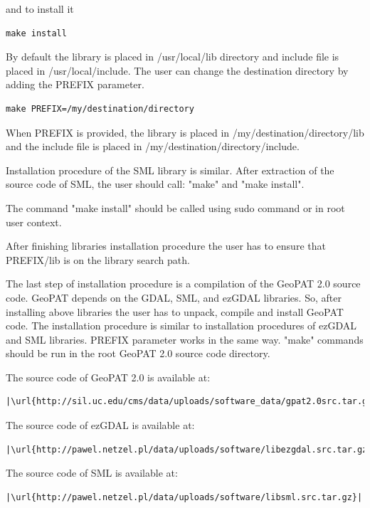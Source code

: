 \documentclass[12pt,margin=0.5in]{article}
\begin{document}
\begin{appendices}
and to install it

\begin{lstlisting}
make install
\end{lstlisting}

By default the library is placed in /usr/local/lib directory and
include file is placed in /usr/local/include.
The user can change the destination directory by adding the PREFIX parameter.

\begin{lstlisting}
make PREFIX=/my/destination/directory
\end{lstlisting}

When PREFIX is provided, the library is placed in
/my/destination/directory/lib and the include file is placed in
/my/destination/directory/include.

Installation procedure of the SML library is similar. After extraction of the source code of SML, the user should call: "make" and "make install".

The command "make install" should be called using sudo command or in
root user context.

After finishing libraries installation procedure the user has to ensure that
PREFIX/lib is on the library search path.

The last step of installation procedure is a compilation of the GeoPAT 2.0
source code. GeoPAT depends on the GDAL, SML, and ezGDAL libraries.
So, after installing above libraries the user has to unpack, compile
and install GeoPAT code.
The installation procedure is similar to installation procedures of
ezGDAL and SML libraries. PREFIX parameter works in the same way.
"make" commands should be run in the root GeoPAT 2.0 source code
directory.

The source code of GeoPAT 2.0 is available at:

\begin{lstlisting}[escapechar=|]
|\url{http://sil.uc.edu/cms/data/uploads/software_data/gpat2.0src.tar.gz}|
\end{lstlisting}

The source code of ezGDAL is available at:

\begin{lstlisting}[escapechar=|]
|\url{http://pawel.netzel.pl/data/uploads/software/libezgdal.src.tar.gz}|
\end{lstlisting}

The source code of SML is available at:

\begin{lstlisting}[escapechar=|]
|\url{http://pawel.netzel.pl/data/uploads/software/libsml.src.tar.gz}|
\end{lstlisting}


\end{appendices}
\end{document}
